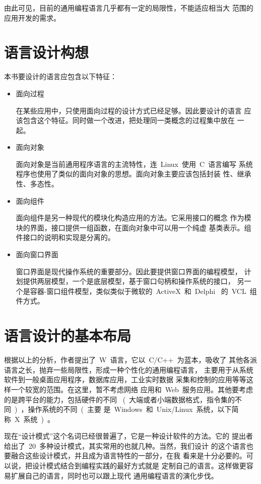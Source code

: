由此可见，目前的通用编程语言几乎都有一定的局限性，不能适应相当大
范围的应用开发的需求。

\section{语言设计构想}

本书要设计的语言应包含以下特征：

\begin{itemize}
\item{面向过程}

在某些应用中，只使用面向过程的设计方式已经足够。因此要设计的语言
应该包含这个特征。同时做一个改进，把处理同一类概念的过程集中放在
一起。

\item{面向对象}

面向对象是当前通用程序语言的主流特性，连~Linux~使用~C~语言编写
系统程序也使用了类似的面向对象的思想。面向对象主要应该包括封装
性、继承性、多态性。

\item{面向组件}

面向组件是另一种现代的模块化构造应用的方法。它采用接口的概念
作为模块的界面，接口提供一组函数，在面向对象中可以用一个纯虚
基类表示。组件接口的说明和实现是分离的。

\item{面向窗口界面}

窗口界面是现代操作系统的重要部分。因此要提供窗口界面的编程模型，
计划提供两层模型，一个是底层模型，基于窗口句柄和操作系统的接口，
另一个是容器-窗口组件模型，类似类似于微软的~ActiveX~和~Delphi~
的~VCL~组件方式。

\end{itemize}

\section{语言设计的基本布局}

根据以上的分析，作者提出了~W~语言，它以~C/C++~为蓝本，吸收了
其他各派语言之长，抛弃一些局限性，形成一种个性化的通用编程语言，
主要用于从系统软件到一般桌面应用程序，数据库应用，工业实时数据
采集和控制的应用等等这样一个较宽的范围。在这里，暂不考虑网络
应用和~Web~服务应用。其他要考虑的是跨平台的能力，包括硬件的不同
~(~大端或者小端数据格式，指令集的不同~)~，操作系统的不同~(~主要
是~Windows~和~Unix/Linux~系统，以下简称~X~系统~)~。

现在“设计模式”这个名词已经很普遍了，它是一种设计软件的方法。它的
提出者给出了~20~多种设计模式，其实常用的也就几种。当然，我们设计
的这个语言也要融合这些设计模式，并且成为语言特性的一部分，在我
看来是十分必要的。可以说，把设计模式结合到编程实践的最好方式就是
定制自己的语言。这样做更容易扩展自己的语言，同时也可以跟上现代
通用编程语言的演化步伐。

